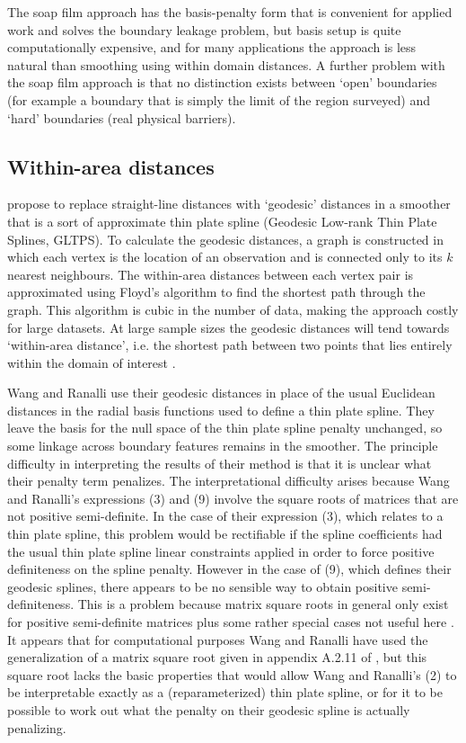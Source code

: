 \documentclass[smallextended]{svjour3}       %
\begin{document}
The soap film approach has the basis-penalty form that is convenient for applied work and solves the boundary leakage problem, but basis setup is quite computationally expensive, and for many applications the approach is less natural than smoothing using within domain distances. A further problem with the soap film approach is that no distinction exists between `open' boundaries (for example a boundary that is simply the limit of the region surveyed) and `hard' boundaries (real physical barriers).

\subsection{Within-area distances}

\cite{Wang:2007tf} propose to replace straight-line distances with `geodesic' distances in a smoother that is a sort of approximate thin plate spline (Geodesic Low-rank Thin Plate Splines, GLTPS). To calculate the geodesic distances, a graph is constructed in which each vertex is the location of an observation and is connected only to its $k$ nearest neighbours. The within-area distances between each vertex pair is approximated using  Floyd's algorithm \citep{Floyd:1962:A9S:367766.368168} to find the shortest path through the graph. This algorithm is cubic in the number of data, making the approach costly for large datasets. At large sample sizes the geodesic distances will tend towards `within-area distance', i.e. the shortest path between two points that lies entirely within the domain of interest \citep{Bernstein:2000tp}.

Wang and Ranalli use their geodesic distances in place of the usual Euclidean distances in the radial basis functions used to define a thin plate spline. They leave the basis for the null space of the thin plate spline penalty unchanged, so some linkage across boundary features remains in the smoother. The principle difficulty in interpreting the results of their method is that it is unclear what their penalty term penalizes. The interpretational difficulty arises because  Wang and Ranalli's expressions (3) and (9) involve the square roots of matrices that are not positive semi-definite. In the case of their expression (3), which relates to a thin plate spline, this problem would be rectifiable if the spline coefficients had the usual thin plate spline linear constraints applied in order to force positive definiteness on the spline penalty. However in the case of (9), which defines their geodesic splines, there appears to be no sensible way to obtain positive semi-definiteness. This is a problem because matrix square roots in general only exist for positive semi-definite matrices plus some rather special cases not useful here \citep[see e.g.]{Higham1987405}. It appears that for computational purposes Wang and Ranalli have used the generalization of a matrix square root given in appendix A.2.11 of \cite{ruppert2003semiparametric}, but this square root lacks the basic properties that would allow Wang and Ranalli's (2) to be interpretable exactly as a (reparameterized) thin plate spline, or for it to be possible to work out what the penalty on their geodesic spline is actually penalizing. 
\end{document}
